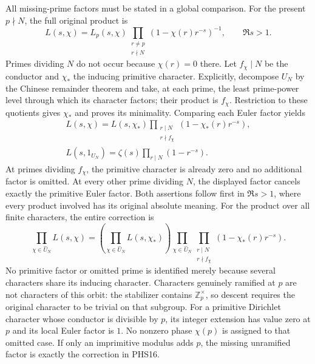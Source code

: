 All missing-prime factors must be stated in a global comparison.
For the present $p\nmid N$, the full original product is
\begin{equation}\tag{PHS15}
 L(s,\chi)=L_p(s,\chi)
       \prod_{\substack{r\ne p\\r\nmid N}}
                (1-\chi(r)r^{-s})^{-1},\qquad\Re s>1.
\end{equation}
Primes dividing $N$ do not occur because $\chi(r)=0$ there.
Let $f_\chi\mid N$ be the conductor and $\chi_*$ the inducing
primitive character. Explicitly, decompose $U_N$ by the Chinese
remainder theorem and take, at each prime, the least prime-power
level through which its character factors; their product is
$f_\chi$. Restriction to these quotients gives $\chi_*$ and
proves its minimality. Comparing each Euler factor yields
\begin{equation}\tag{PHS16}
 \begin{gathered}
 L(s,\chi)=L(s,\chi_*)
       \prod_{\substack{r\mid N\\r\nmid f_\chi}}
                 (1-\chi_*(r)r^{-s}),\\
 L(s,1_{U_N})=\zeta(s)\prod_{r\mid N}(1-r^{-s}).
 \end{gathered}
\end{equation}
At primes dividing $f_\chi$, the primitive character is already
zero and no additional factor is omitted. At every other prime
dividing $N$, the displayed factor cancels exactly the primitive
Euler factor. Both assertions follow first in $\Re s>1$,
where every product involved has its original absolute meaning.
For the product over all finite characters, the entire correction is
\begin{equation}\tag{PHS17}
 \prod_{\chi\in\widehat U_N}L(s,\chi)
 =\left(\prod_{\chi\in\widehat U_N}L(s,\chi_*)\right)
   \prod_{\chi\in\widehat U_N}
       \prod_{\substack{r\mid N\\r\nmid f_\chi}}
                  (1-\chi_*(r)r^{-s}).
\end{equation}
No primitive factor or omitted prime is identified merely because
several characters share its inducing character.
Characters genuinely ramified at $p$ are not characters of this
orbit: the stabilizer contains $\mathbb Z_p^\times$, so descent
requires the original character to be trivial on that subgroup.
For a primitive Dirichlet character whose conductor is divisible
by $p$, its integer extension has value zero at $p$ and its local
Euler factor is $1$. No nonzero phase $\chi(p)$ is assigned to
that omitted case. If only an imprimitive modulus adds $p$,
the missing unramified factor is exactly the correction in PHS16.

